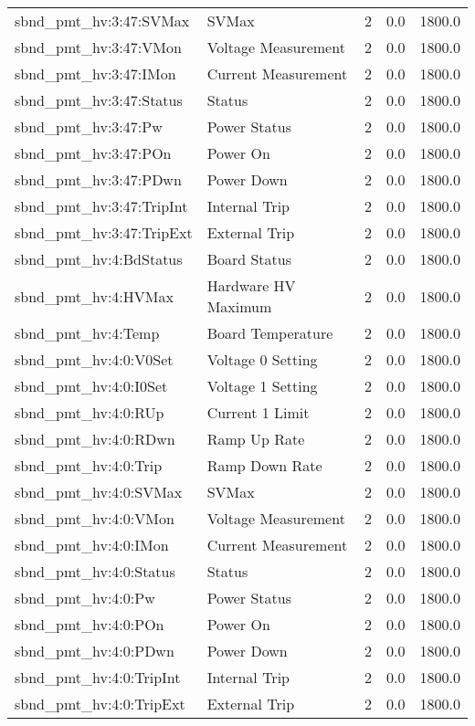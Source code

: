 \begin{center}
\begin{longtable}{l | l l l l }
sbnd\_pmt\_hv:3:47:SVMax & SVMax & 2 & 0.0 & 1800.0\\ 
sbnd\_pmt\_hv:3:47:VMon & Voltage Measurement & 2 & 0.0 & 1800.0\\ 
sbnd\_pmt\_hv:3:47:IMon & Current Measurement & 2 & 0.0 & 1800.0\\ 
sbnd\_pmt\_hv:3:47:Status & Status & 2 & 0.0 & 1800.0\\ 
sbnd\_pmt\_hv:3:47:Pw & Power Status & 2 & 0.0 & 1800.0\\ 
sbnd\_pmt\_hv:3:47:POn & Power On & 2 & 0.0 & 1800.0\\ 
sbnd\_pmt\_hv:3:47:PDwn & Power Down & 2 & 0.0 & 1800.0\\ 
sbnd\_pmt\_hv:3:47:TripInt & Internal Trip & 2 & 0.0 & 1800.0\\ 
sbnd\_pmt\_hv:3:47:TripExt & External Trip & 2 & 0.0 & 1800.0\\ 
sbnd\_pmt\_hv:4:BdStatus & Board Status & 2 & 0.0 & 1800.0\\ 
sbnd\_pmt\_hv:4:HVMax & Hardware HV Maximum & 2 & 0.0 & 1800.0\\ 
sbnd\_pmt\_hv:4:Temp & Board Temperature & 2 & 0.0 & 1800.0\\ 
sbnd\_pmt\_hv:4:0:V0Set & Voltage 0 Setting & 2 & 0.0 & 1800.0\\ 
sbnd\_pmt\_hv:4:0:I0Set & Voltage 1 Setting & 2 & 0.0 & 1800.0\\ 
sbnd\_pmt\_hv:4:0:RUp & Current 1 Limit & 2 & 0.0 & 1800.0\\ 
sbnd\_pmt\_hv:4:0:RDwn & Ramp Up Rate & 2 & 0.0 & 1800.0\\ 
sbnd\_pmt\_hv:4:0:Trip & Ramp Down Rate & 2 & 0.0 & 1800.0\\ 
sbnd\_pmt\_hv:4:0:SVMax & SVMax & 2 & 0.0 & 1800.0\\ 
sbnd\_pmt\_hv:4:0:VMon & Voltage Measurement & 2 & 0.0 & 1800.0\\ 
sbnd\_pmt\_hv:4:0:IMon & Current Measurement & 2 & 0.0 & 1800.0\\ 
sbnd\_pmt\_hv:4:0:Status & Status & 2 & 0.0 & 1800.0\\ 
sbnd\_pmt\_hv:4:0:Pw & Power Status & 2 & 0.0 & 1800.0\\ 
sbnd\_pmt\_hv:4:0:POn & Power On & 2 & 0.0 & 1800.0\\ 
sbnd\_pmt\_hv:4:0:PDwn & Power Down & 2 & 0.0 & 1800.0\\ 
sbnd\_pmt\_hv:4:0:TripInt & Internal Trip & 2 & 0.0 & 1800.0\\ 
sbnd\_pmt\_hv:4:0:TripExt & External Trip & 2 & 0.0 & 1800.0\\ 

\end{longtable}
\end{center}

